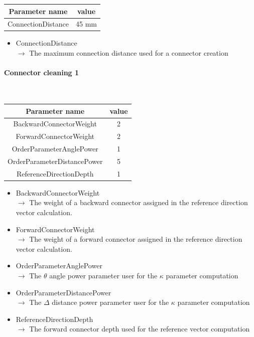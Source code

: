\documentclass[cits]{JINST}
\begin{document}
\begin{table}[!ht]
  \begin{center}
    \begin{tabu} to \linewidth { c | c } 
          Parameter name & value \\
          \hline
          ConnectionDistance & 45 mm
    \end{tabu} 
  \end{center}
\end{table}

\begin{itemize}
  \item ConnectionDistance \\
  $\rightarrow$ The maximum connection distance used for a connector creation
\end{itemize}


\newpage
\paragraph{Connector cleaning 1} ~

\begin{table}[!ht]
  \begin{center}
    \begin{tabu} to \linewidth { c | c } 
          Parameter name & value \\
          \hline
          BackwardConnectorWeight & 2 \\
          ForwardConnectorWeight & 2 \\
          OrderParameterAnglePower & 1 \\
          OrderParameterDistancePower & 5 \\
          ReferenceDirectionDepth & 1
    \end{tabu} 
  \end{center}
\end{table}

\begin{itemize}
  \item BackwardConnectorWeight \\
  $\rightarrow$ The weight of a backward connector assigned in the reference direction vector calculation.
  \item ForwardConnectorWeight \\
  $\rightarrow$ The weight of a forward connector assigned in the reference direction vector calculation.
  \item OrderParameterAnglePower \\
  $\rightarrow$ The $\theta$ angle power parameter user for the $\kappa$ parameter computation
  \item OrderParameterDistancePower \\
  $\rightarrow$ The $\Delta$ distance power parameter user for the $\kappa$ parameter computation
  \item ReferenceDirectionDepth \\
  $\rightarrow$ The forward connector depth used for the reference vector computation
\end{itemize}
\end{document}
